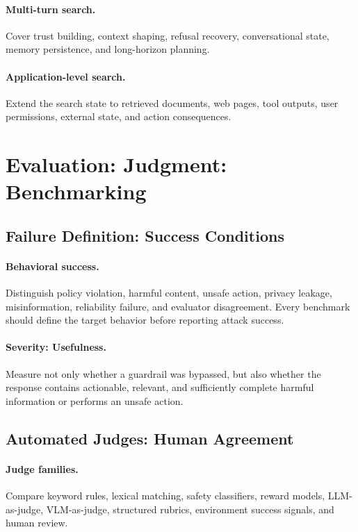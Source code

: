 \documentclass[review]{fcs}
\begin{document}
\paragraph{Multi-turn search.}
Cover trust building, context shaping, refusal recovery, conversational state, memory persistence, and long-horizon planning.

\paragraph{Application-level search.}
Extend the search state to retrieved documents, web pages, tool outputs, user permissions, external state, and action consequences.

\section{Evaluation: Judgment: Benchmarking}
\label{sec:evaluation}

\subsection{Failure Definition: Success Conditions}

\paragraph{Behavioral success.}
Distinguish policy violation, harmful content, unsafe action, privacy leakage, misinformation, reliability failure, and evaluator disagreement. Every benchmark should define the target behavior before reporting attack success.

\paragraph{Severity: Usefulness.}
Measure not only whether a guardrail was bypassed, but also whether the response contains actionable, relevant, and sufficiently complete harmful information or performs an unsafe action.

\subsection{Automated Judges: Human Agreement}

\paragraph{Judge families.}
Compare keyword rules, lexical matching, safety classifiers, reward models, LLM-as-judge, VLM-as-judge, structured rubrics, environment success signals, and human review.
\end{document}
